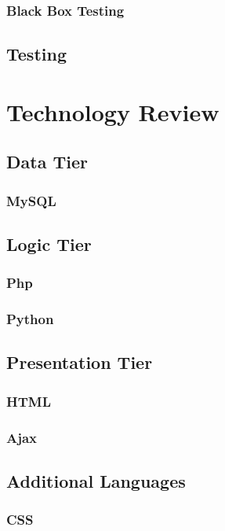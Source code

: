 \subsection{Black Box Testing}

\section{Testing}



\chapter{Technology Review}

\section{Data Tier}
\subsection{MySQL}

\section{Logic Tier}
\subsection{Php}
\subsection{Python}


\section{Presentation Tier}
\subsection{HTML}
\subsection{Ajax}

\section{Additional Languages}
\subsection{CSS}
